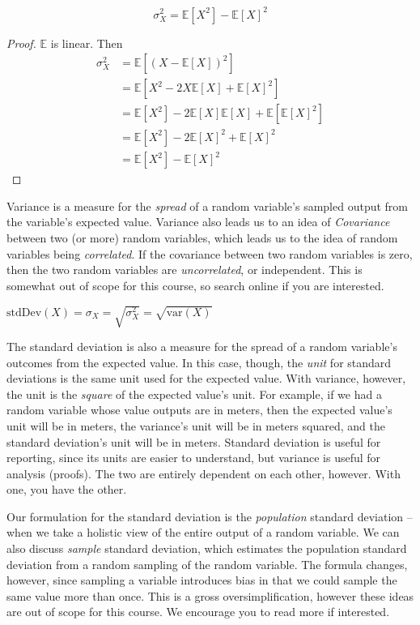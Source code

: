 \documentclass[main.tex]{subfiles}
\begin{document}
\begin{prop}
	\[\sigma_X^2 = \mathbb{E}[X^2] - \mathbb{E}[X]^2\]
\end{prop}

\begin{proof}
	\(\mathbb{E}\) is linear. Then
	\begin{align*}
	\sigma_X^2 &= \mathbb{E}[(X-\mathbb{E}[X])^2] \\
	&= \mathbb{E}[X^2 - 2X\mathbb{E}[X] + \mathbb{E}[X]^2] \\
	&= \mathbb{E}[X^2] - 2\mathbb{E}[X]\mathbb{E}[X] + \mathbb{E}[\mathbb{E}[X]^2] \\
	&= \mathbb{E}[X^2] - 2\mathbb{E}[X]^2 + \mathbb{E}[X]^2 \\
	&= \mathbb{E}[X^2] - \mathbb{E}[X]^2
	\end{align*}
\end{proof}

Variance is a measure for the \textit{spread} of a random variable's sampled output from the variable's expected value.
Variance also leads us to an idea of \textit{Covariance} between two (or more) random variables, which leads us to the idea of random variables being \textit{correlated}. If the covariance between two random variables is zero, then the two random variables are \textit{uncorrelated}, or independent. This is somewhat out of scope for this course, so search online if you are interested.

\begin{defn}
	\(\text{stdDev}(X) = \sigma_X = \sqrt{\sigma_X^2} = \sqrt{\text{var}(X)}\)
\end{defn}

The standard deviation is also a measure for the spread of a random variable's outcomes from the expected value. In this case, though, the \textit{unit} for standard deviations is the same unit used for the expected value. With variance, however, the unit is the \textit{square} of the expected value's unit. For example, if we had a random variable whose value outputs are in meters, then the expected value's unit will be in meters, the variance's unit will be in meters squared, and the standard deviation's unit will be in meters. Standard deviation is useful for reporting, since its units are easier to understand, but variance is useful for analysis (proofs). The two are entirely dependent on each other, however. With one, you have the other.

Our formulation for the standard deviation is the \textit{population} standard deviation -- when we take a holistic view of the entire output of a random variable. We can also discuss \textit{sample} standard deviation, which estimates the population standard deviation from a random sampling of the random variable. The formula changes, however, since sampling a variable introduces bias in that we could sample the same value more than once. This is a gross oversimplification, however these ideas are out of scope for this course. We encourage you to read more if interested.
\end{document}
